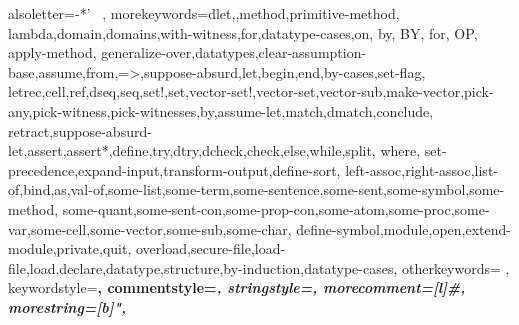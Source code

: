 \usepackage{listings-fix}
\usepackage{xcolor}
\usepackage{textcomp}

\newcommand{\textapprox}{\raisebox{-0.10ex}{\fontsize{11.5}{13.8}{\selectfont \texttildelow}}}


\newcommand{\mkwd}[1]{\mtt{\color{kwdColor}{{\bfseries #1}}}}
\newcommand{\smkwd}[1]{\smtt{\color{kwdColor}{{\bfseries #1}}}}
\newcommand{\fmkwd}[1]{\fmtt{\color{kwdColor}{{\bfseries #1}}}}



 {alsoletter={-*'~%
    },
   morekeywords={dlet,,method,primitive-method, lambda,domain,domains,with-witness,for,datatype-cases,on,%
     by, BY, for, OP, apply-method,%
generalize-over,datatypes,clear-assumption-base,assume,from,=>,suppose-absurd,let,begin,end,by-cases,set-flag,%
letrec,cell,ref,dseq,seq,set!,set,vector-set!,vector-set,vector-sub,make-vector,pick-any,pick-witness,pick-witnesses,by,assume-let,match,dmatch,conclude,%
retract,suppose-absurd-let,assert,assert*,define,try,dtry,dcheck,check,else,while,split, where, set-precedence,expand-input,transform-output,define-sort, 
left-assoc,right-assoc,list-of,bind,as,val-of,some-list,some-term,some-sentence,some-sent,some-symbol,some-method,
some-quant,some-sent-con,some-prop-con,some-atom,some-proc,some-var,some-cell,some-vector,some-sub,some-char,
define-symbol,module,open,extend-module,private,quit,
overload,secure-file,load-file,load,declare,datatype,structure,by-induction,datatype-cases},
 otherkeywords={%
                },
keywordstyle=\color{kwdColor}\bfseries,
commentstyle=\itshape\color{green!40!black}\itshape,
stringstyle=\ttfamily,
morecomment=[l]{\#},
morestring=[b]",
}


